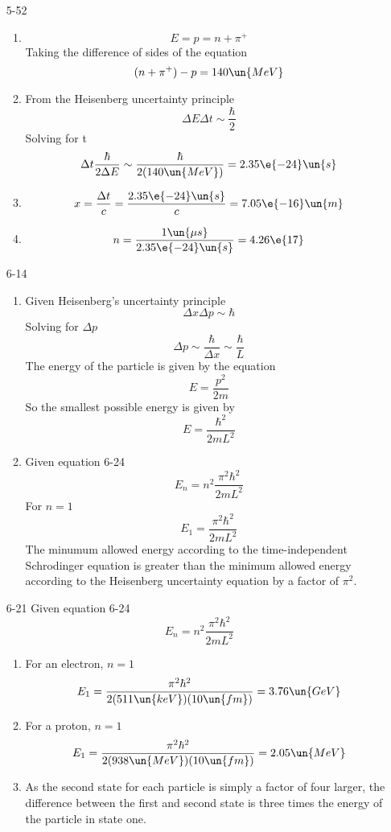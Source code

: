 \documentclass[]{2620hw}
\begin{document}
\maketitle
\begin{enumerate}
    
\item [5-52] 
\begin{enumerate}
	\item 
	\[
		E = p = n + \pi^+
	\]
	Taking the difference of sides of the equation
	\[
		(n + \pi^+) - p = 140 \un{MeV}	
	\]
	\item From the Heisenberg uncertainty principle
	\[
		\Delta E \Delta t \sim \frac{\hbar}{2}
	\]
	Solving for t
	\[
		\Delta t  \frac{\hbar}{2\Delta E} \sim  \frac{\hbar}{2(140 \un{MeV})}  = 2.35 \e{-24}\un{s}
	\]
	\item 
	\[
		x = \frac{\Delta t}{c} = \frac{2.35 \e{-24}\un{s}}{c} = 7.05 \e{-16}\un{m}
	\]
	\item 
	\[
		n = \frac{1\un{\mu s}}{2.35 \e{-24}\un{s}} = 4.26 \e{17}
	\]
	
\end{enumerate}
	
\item [6-14]
\begin{enumerate}
	\item Given Heisenberg's uncertainty principle
	\[
		\Delta x \Delta p \sim \hbar
	\]
	Solving for $\Delta p$
	\[
		\Delta p \sim \frac{\hbar}{\Delta x} \sim \frac{\hbar}{L}
	\]
	The energy of the particle is given by the equation
	\[
		E = \frac{p^2}{2m}
	\]
	So the smallest possible energy is given by 
	\[
		E = \frac{\hbar^2}{2mL^2}
	\]
	\item Given equation 6-24
	\[
		E_n = n^2 \frac{\pi^2 \hbar^2}{2mL^2}
	\]
	For $n=1$
	\[
		E_1 = \frac{\pi^2 \hbar^2}{2mL^2}
	\]
	The minumum allowed energy according to the time-independent Schrodinger equation is greater than the minimum allowed energy according to the Heisenberg uncertainty equation by a factor of $\pi^2$.
\end{enumerate}

\item [6-21]
	Given equation 6-24
	\[
		E_n = n^2 \frac{\pi^2 \hbar^2}{2mL^2}
	\]
\begin{enumerate}
	\item For an electron,  $n=1$
	\[
		E_1 = \frac{\pi^2 \hbar^2}{2(511\un{keV})(10\un{fm})} = 3.76 \un{GeV}
	\]
	\item For a proton, $n=1$
	\[
		E_1 = \frac{\pi^2 \hbar^2}{2(938\un{MeV})(10\un{fm})} = 2.05 \un{MeV}
	\]
	\item As the second state for each particle is simply a factor of four larger, the difference between the first and second state is three times the energy of the particle in state one.
	

\end{enumerate}
\end{enumerate}
\end{document}
